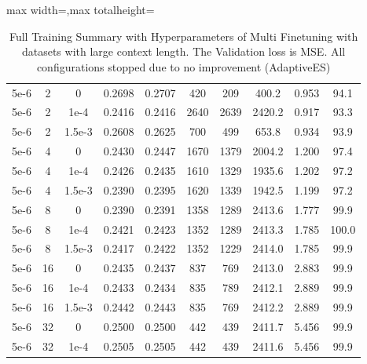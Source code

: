 \begin{table}[p]
\begin{adjustbox}{max width=\textwidth,max totalheight=\textheight}
\begin{tabular}{cccccccccc}
5e-6&2&0&0.2698&0.2707&420&209&400.2&0.953&94.1\\
5e-6&2&1e-4&0.2416&0.2416&2640&2639&2420.2&0.917&93.3\\
5e-6&2&1.5e-3&0.2608&0.2625&700&499&653.8&0.934&93.9\\
5e-6&4&0&0.2430&0.2447&1670&1379&2004.2&1.200&97.4\\
5e-6&4&1e-4&0.2426&0.2435&1610&1329&1935.6&1.202&97.2\\
5e-6&4&1.5e-3&0.2390&0.2395&1620&1339&1942.5&1.199&97.2\\
5e-6&8&0&0.2390&0.2391&1358&1289&2413.6&1.777&99.9\\
5e-6&8&1e-4&0.2421&0.2423&1352&1289&2413.3&1.785&100.0\\
5e-6&8&1.5e-3&0.2417&0.2422&1352&1229&2414.0&1.785&99.9\\
5e-6&16&0&0.2435&0.2437&837&769&2413.0&2.883&99.9\\
5e-6&16&1e-4&0.2433&0.2434&835&789&2412.1&2.889&99.9\\
5e-6&16&1.5e-3&0.2442&0.2443&835&769&2412.2&2.889&99.9\\
5e-6&32&0&0.2500&0.2500&442&439&2411.7&5.456&99.9\\
5e-6&32&1e-4&0.2505&0.2505&442&439&2411.6&5.456&99.9\\
\hline
\end{tabular}
\end{adjustbox}
\caption{Full Training Summary with Hyperparameters of Multi Finetuning with datasets with large context length. The Validation loss is MSE. All configurations stopped due to no improvement (AdaptiveES)}
\end{table}


